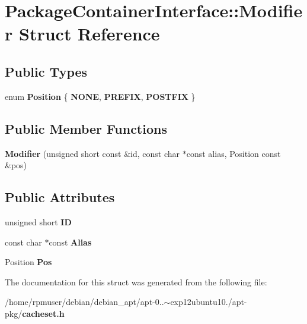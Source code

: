 \section{\-Package\-Container\-Interface\-:\-:\-Modifier \-Struct \-Reference}
\label{structAPT_1_1PackageContainerInterface_1_1Modifier}
\subsection*{\-Public \-Types}
\begin{DoxyCompactItemize}
\item 
enum {\bfseries \-Position} \{ {\bfseries \-N\-O\-N\-E}, 
{\bfseries \-P\-R\-E\-F\-I\-X}, 
{\bfseries \-P\-O\-S\-T\-F\-I\-X}
 \}
\end{DoxyCompactItemize}
\subsection*{\-Public \-Member \-Functions}
\begin{DoxyCompactItemize}
\item 
{\bfseries \-Modifier} (unsigned short const \&id, const char $\ast$const alias, \-Position const \&pos)\label{structAPT_1_1PackageContainerInterface_1_1Modifier_a4a253e1662e54fa6a7ab5064cb8c83a7}

\end{DoxyCompactItemize}
\subsection*{\-Public \-Attributes}
\begin{DoxyCompactItemize}
\item 
unsigned short {\bfseries \-I\-D}\label{structAPT_1_1PackageContainerInterface_1_1Modifier_a079e9ceeace88427313caef809d32dee}

\item 
const char $\ast$const {\bfseries \-Alias}\label{structAPT_1_1PackageContainerInterface_1_1Modifier_a5c49213c5e29a65db2a3378b543ca7d3}

\item 
\-Position {\bfseries \-Pos}\label{structAPT_1_1PackageContainerInterface_1_1Modifier_ab6c2931d7066526de7ed805cc1f7d90c}

\end{DoxyCompactItemize}


\-The documentation for this struct was generated from the following file\-:\begin{DoxyCompactItemize}
\item 
/home/rpmuser/debian/debian\-\_\-apt/apt-\/0..$\sim$exp12ubuntu10./apt-\/pkg/{\bf cacheset.\-h}\end{DoxyCompactItemize}
